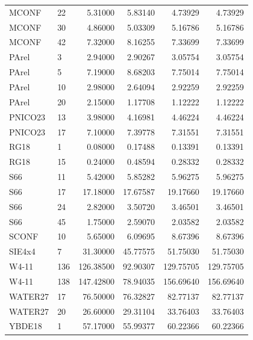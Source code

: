 {\begin{longtable}{llrrrr}
MCONF & 22 & 5.31000 & 5.83140 & 4.73929 & 4.73929 \\
MCONF & 30 & 4.86000 & 5.03309 & 5.16786 & 5.16786 \\
MCONF & 42 & 7.32000 & 8.16255 & 7.33699 & 7.33699 \\
PArel & 3 & 2.94000 & 2.90267 & 3.05754 & 3.05754 \\
PArel & 5 & 7.19000 & 8.68203 & 7.75014 & 7.75014 \\
PArel & 10 & 2.98000 & 2.64094 & 2.92259 & 2.92259 \\
PArel & 20 & 2.15000 & 1.17708 & 1.12222 & 1.12222 \\
PNICO23 & 13 & 3.98000 & 4.16981 & 4.46224 & 4.46224 \\
PNICO23 & 17 & 7.10000 & 7.39778 & 7.31551 & 7.31551 \\
RG18 & 1 & 0.08000 & 0.17488 & 0.13391 & 0.13391 \\
RG18 & 15 & 0.24000 & 0.48594 & 0.28332 & 0.28332 \\
S66 & 11 & 5.42000 & 5.85282 & 5.96275 & 5.96275 \\
S66 & 17 & 17.18000 & 17.67587 & 19.17660 & 19.17660 \\
S66 & 24 & 2.82000 & 3.50720 & 3.46501 & 3.46501 \\
S66 & 45 & 1.75000 & 2.59070 & 2.03582 & 2.03582 \\
SCONF & 10 & 5.65000 & 6.09695 & 8.67396 & 8.67396 \\
SIE4x4 & 7 & 31.30000 & 45.77575 & 51.75030 & 51.75030 \\
W4-11 & 136 & 126.38500 & 92.90307 & 129.75705 & 129.75705 \\
W4-11 & 138 & 147.42800 & 78.94035 & 156.69640 & 156.69640 \\
WATER27 & 17 & 76.50000 & 76.32827 & 82.77137 & 82.77137 \\
WATER27 & 20 & 26.60000 & 29.31104 & 33.76403 & 33.76403 \\
YBDE18 & 1 & 57.17000 & 55.99377 & 60.22366 & 60.22366 \\
\bottomrule
\end{longtable}
}
